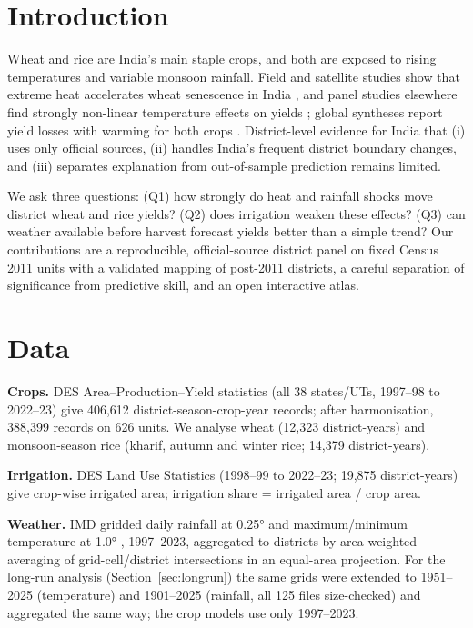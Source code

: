 \documentclass[conference]{IEEEtran}
\begin{document}
\section{Introduction}
Wheat and rice are India's main staple crops, and both are exposed to rising temperatures and variable monsoon
rainfall. Field and satellite studies show that extreme heat accelerates wheat senescence in India \cite{lobell2012},
and panel studies elsewhere find strongly non-linear temperature effects on yields \cite{schlenker2009}; global
syntheses report yield losses with warming for both crops \cite{asseng2015,zhao2017}. District-level evidence for India
that (i) uses only official sources, (ii) handles India's frequent district boundary changes, and (iii) separates
explanation from out-of-sample prediction remains limited.

We ask three questions: (Q1) how strongly do heat and rainfall shocks move district wheat and rice yields?
(Q2) does irrigation weaken these effects? (Q3) can weather available before harvest forecast yields better than a
simple trend? Our contributions are a reproducible, official-source district panel on fixed Census 2011 units with a
validated mapping of post-2011 districts, a careful separation of significance from predictive skill, and an open
interactive atlas.

\section{Data}
\textbf{Crops.} DES Area--Production--Yield statistics (all 38 states/UTs, 1997--98 to 2022--23) give
406{,}612 district-season-crop-year records; after harmonisation, 388{,}399 records on 626 units. We analyse wheat
(12{,}323 district-years) and monsoon-season rice (kharif, autumn and winter rice; 14{,}379 district-years).

\textbf{Irrigation.} DES Land Use Statistics (1998--99 to 2022--23; 19{,}875 district-years) give crop-wise
irrigated area; irrigation share = irrigated area / crop area.

\textbf{Weather.} IMD gridded daily rainfall at \ang{0.25} \cite{pai2014} and maximum/minimum temperature at
\ang{1.0} \cite{srivastava2009}, 1997--2023, aggregated to districts by area-weighted averaging of grid-cell/district
intersections in an equal-area projection. For the long-run analysis (Section~\ref{sec:longrun}) the same grids were
extended to 1951--2025 (temperature) and 1901--2025 (rainfall, all 125 files size-checked) and aggregated the same way;
the crop models use only 1997--2023.
\end{document}
